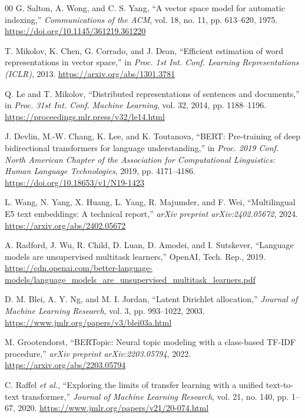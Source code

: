 \documentclass[conference]{IEEEtran}
\begin{document}
\begin{thebibliography}{00}
G. Salton, A. Wong, and C. S. Yang,
``A vector space model for automatic indexing,''
\textit{Communications of the ACM}, vol. 18, no. 11, pp. 613--620, 1975.
\url{https://doi.org/10.1145/361219.361220}

T. Mikolov, K. Chen, G. Corrado, and J. Dean,
``Efficient estimation of word representations in vector space,''
in \textit{Proc. 1st Int. Conf. Learning Representations (ICLR)}, 2013.
\url{https://arxiv.org/abs/1301.3781}

Q. Le and T. Mikolov,
``Distributed representations of sentences and documents,''
in \textit{Proc. 31st Int. Conf. Machine Learning}, vol. 32, 2014,
pp. 1188--1196.
\url{https://proceedings.mlr.press/v32/le14.html}

J. Devlin, M.-W. Chang, K. Lee, and K. Toutanova,
``BERT: Pre-training of deep bidirectional transformers for language understanding,''
in \textit{Proc. 2019 Conf. North American Chapter of the Association for Computational Linguistics: Human Language Technologies}, 2019,
pp. 4171--4186.
\url{https://doi.org/10.18653/v1/N19-1423}

L. Wang, N. Yang, X. Huang, L. Yang, R. Majumder, and F. Wei,
``Multilingual E5 text embeddings: A technical report,''
\textit{arXiv preprint arXiv:2402.05672}, 2024.
\url{https://arxiv.org/abs/2402.05672}

A. Radford, J. Wu, R. Child, D. Luan, D. Amodei, and I. Sutskever,
``Language models are unsupervised multitask learners,''
OpenAI, Tech. Rep., 2019.
\url{https://cdn.openai.com/better-language-models/language_models_are_unsupervised_multitask_learners.pdf}


D. M. Blei, A. Y. Ng, and M. I. Jordan,
``Latent Dirichlet allocation,''
\textit{Journal of Machine Learning Research}, vol. 3, pp. 993--1022, 2003.
\url{https://www.jmlr.org/papers/v3/blei03a.html}

M. Grootendorst,
``BERTopic: Neural topic modeling with a class-based TF-IDF procedure,''
\textit{arXiv preprint arXiv:2203.05794}, 2022.
\url{https://arxiv.org/abs/2203.05794}

C. Raffel \textit{et al.},
``Exploring the limits of transfer learning with a unified text-to-text transformer,''
\textit{Journal of Machine Learning Research}, vol. 21, no. 140, pp. 1--67, 2020.
\url{https://www.jmlr.org/papers/v21/20-074.html}

\end{thebibliography}
\end{document}
